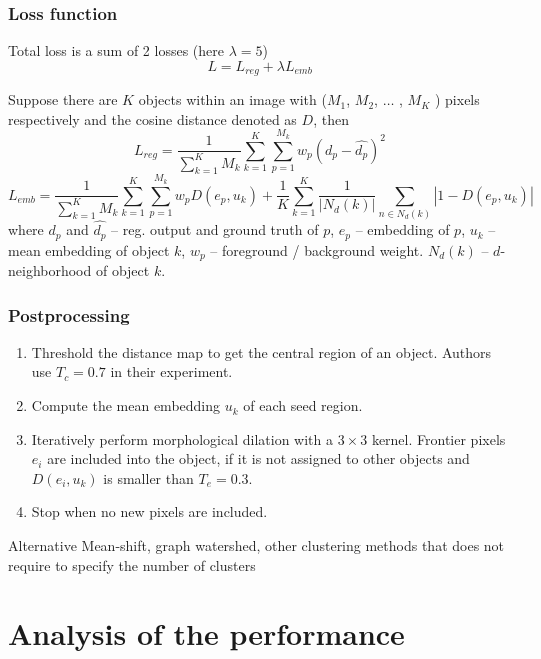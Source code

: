 \documentclass{beamer}
\begin{document}
\begin{frame}
    \frametitle{Loss function}

    Total loss is a sum of 2 losses (here $\lambda = 5$)
    \[
        L = L_{reg} + \lambda L_{emb}
    \]

    Suppose there are $K$ objects within an image with ($M_1$, $M_2$, $\dots$ , $M_K$ )
    pixels respectively and the cosine distance denoted as $D$, then
    \[
        L_{reg} = \frac{1}{\sum\limits_{k=1}^K M_k} \sum\limits_{k=1}^K \sum\limits_{p=1}^{M_k} w_p (d_p - \hat{d_p})^2
    \]
    \[
        L_{emb} = \frac{1}{\sum\limits_{k=1}^K M_k} \sum\limits_{k=1}^K \sum\limits_{p=1}^{M_k} w_p D(e_p, u_k) +
        \frac{1}{K} \sum\limits_{k=1}^K \frac{1}{|N_d(k)|} \sum\limits_{n \in N_d(k)} |1 - D(e_p, u_k)|
    \]
    where $d_p$ and $\hat{d_p}$ -- reg. output and ground truth of $p$, $e_p$ --
    embedding of $p$, $u_k$ -- mean embedding of object $k$,
    $w_p$ -- foreground / background weight. $N_d(k)$ -- $d$-neighborhood of object $k$.

\end{frame}

\begin{frame}
    \frametitle{Postprocessing}

    \begin{enumerate}
        \item Threshold the distance map to get the central region of an object. Authors use $T_c = 0.7$ in their experiment.
        \item Compute the mean embedding $u_k$ of each seed region.
        \item Iteratively perform morphological dilation with a $3 \times 3$ kernel.
        Frontier pixels $e_i$ are included into the object, if it is not assigned to other objects and
        $D(e_i, u_k)$ is smaller than $T_e = 0.3$.
        \item Stop when no new pixels are included.
    \end{enumerate}

    \begin{exampleblock}{Alternative}
        Mean-shift, graph watershed, other clustering methods that
        does not require to specify the number of clusters
    \end{exampleblock}

\end{frame}

\section{Analysis of the performance}
\end{document}
